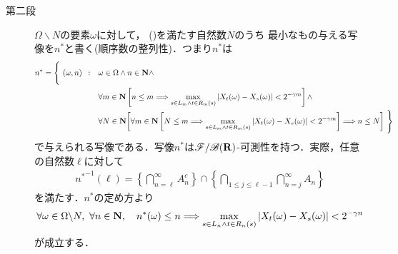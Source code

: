 \begin{prf}
\begin{description}
			\item[第二段]
				$\Omega \backslash N$の要素$\omega$に対して，
				()を満たす自然数$N$のうち
				最小なもの与える写像を$n^*$と書く(順序数の整列性)．つまり$n^*$は
				\begin{align}
					n^* = \Biggl\{\ (\omega,n)\ \, : \quad &\omega \in \Omega \wedge n \in \mathbf{N} \wedge \Biggr.\\
					&\forall m \in \mathbf{N}\left[n \leq m \Longrightarrow \operatorname*{max}_{s \in L_m \wedge t \in R_m(s)}
						|X_t(\omega) - X_s(\omega)| < 2^{-\gamma m}\right] \wedge \\
					&\forall N \in \mathbf{N}
					\Biggl. \left[\forall m \in \mathbf{N}\left[N \leq m \Longrightarrow \operatorname*{max}_{s \in L_m \wedge t \in R_m(s)}
						|X_t(\omega) - X_s(\omega)| < 2^{-\gamma m}\right] \Longrightarrow n \leq N\right]\ \Biggr\}
				\end{align}
				で与えられる写像である．写像$n^*$は$\mathscr{F}/\mathscr{B}(\mathbf{R})$-可測性を持つ．実際，任意の自然数$\ell$に対して
				\begin{align}
					{n^*}^{-1}(\ell) = \left\{ \bigcap_{n = \ell}^\infty A_n^c \right\} \cap \left\{ \bigcap_{1 \leq j \leq \ell-1} \bigcap_{n = j}^\infty A_n \right\}
				\end{align}
				を満たす．$n^*$の定め方より
				\begin{align}
					\forall \omega \in \Omega \backslash N,\
					\forall n \in \mathbf{N},\quad 
					n^*(\omega) \leq n \Longrightarrow \operatorname*{max}_{s \in L_n \wedge t \in R_n(s)}|X_t(\omega) - X_s(\omega)| < 2^{-\gamma n}
					\label{eq:chapter_2_theorem_2_8_2}
				\end{align}
				が成立する．
				

\end{description}
\end{prf}
